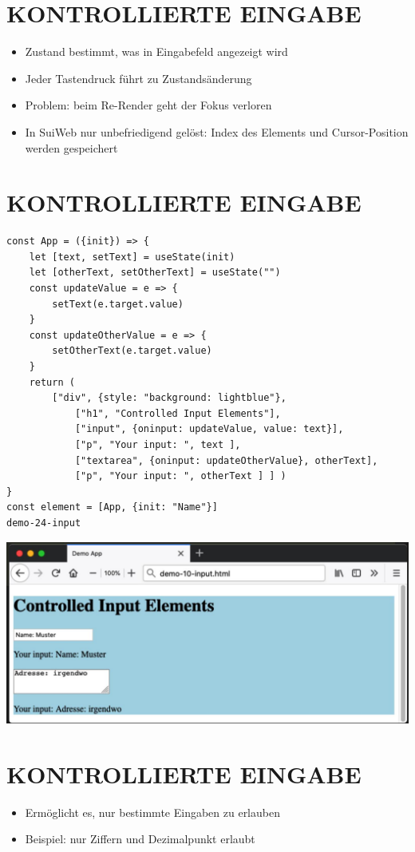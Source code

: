 \section*{KONTROLLIERTE EINGABE}
\begin{itemize}
  \item Zustand bestimmt, was in Eingabefeld angezeigt wird
  \item Jeder Tastendruck führt zu Zustandsänderung
  \item Problem: beim Re-Render geht der Fokus verloren
  \item In SuiWeb nur unbefriedigend gelöst: Index des Elements und Cursor-Position werden gespeichert
\end{itemize}

\section*{KONTROLLIERTE EINGABE}
\begin{verbatim}
const App = ({init}) => {
    let [text, setText] = useState(init)
    let [otherText, setOtherText] = useState("")
    const updateValue = e => {
        setText(e.target.value)
    }
    const updateOtherValue = e => {
        setOtherText(e.target.value)
    }
    return (
        ["div", {style: "background: lightblue"},
            ["h1", "Controlled Input Elements"],
            ["input", {oninput: updateValue, value: text}],
            ["p", "Your input: ", text ],
            ["textarea", {oninput: updateOtherValue}, otherText],
            ["p", "Your input: ", otherText ] ] )
}
const element = [App, {init: "Name"}]
demo-24-input
\end{verbatim}

\begin{center}
\includegraphics[width=\linewidth]{images/2025_01_02_a730400f36f38fd94791g-17}
\end{center}

\section*{KONTROLLIERTE EINGABE}
\begin{itemize}
  \item Ermöglicht es, nur bestimmte Eingaben zu erlauben
  \item Beispiel: nur Ziffern und Dezimalpunkt erlaubt
\end{itemize}

